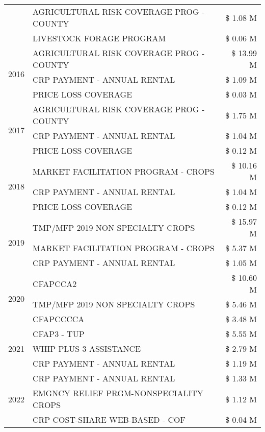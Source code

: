 \begin{tabular}{llr}
 & AGRICULTURAL RISK COVERAGE PROG - COUNTY & \$ 1.08 M \\
 & LIVESTOCK FORAGE PROGRAM & \$ 0.06 M \\
\cline{1-3}
\multirow[t]{3}{*}{2016} & AGRICULTURAL RISK COVERAGE PROG - COUNTY & \$ 13.99 M \\
 & CRP PAYMENT - ANNUAL RENTAL & \$ 1.09 M \\
 & PRICE LOSS COVERAGE & \$ 0.03 M \\
\cline{1-3}
\multirow[t]{3}{*}{2017} & AGRICULTURAL RISK COVERAGE PROG - COUNTY & \$ 1.75 M \\
 & CRP PAYMENT - ANNUAL RENTAL & \$ 1.04 M \\
 & PRICE LOSS COVERAGE & \$ 0.12 M \\
\cline{1-3}
\multirow[t]{3}{*}{2018} & MARKET FACILITATION PROGRAM - CROPS & \$ 10.16 M \\
 & CRP PAYMENT - ANNUAL RENTAL & \$ 1.04 M \\
 & PRICE LOSS COVERAGE & \$ 0.12 M \\
\cline{1-3}
\multirow[t]{3}{*}{2019} & TMP/MFP 2019 NON SPECIALTY CROPS & \$ 15.97 M \\
 & MARKET FACILITATION PROGRAM - CROPS & \$ 5.37 M \\
 & CRP PAYMENT - ANNUAL RENTAL & \$ 1.05 M \\
\cline{1-3}
\multirow[t]{3}{*}{2020} & CFAPCCA2 & \$ 10.60 M \\
 & TMP/MFP 2019 NON SPECIALTY CROPS & \$ 5.46 M \\
 & CFAPCCCCA & \$ 3.48 M \\
\cline{1-3}
\multirow[t]{3}{*}{2021} & CFAP3 - TUP & \$ 5.55 M \\
 & WHIP PLUS 3 ASSISTANCE & \$ 2.79 M \\
 & CRP PAYMENT - ANNUAL RENTAL & \$ 1.19 M \\
\cline{1-3}
\multirow[t]{3}{*}{2022} & CRP PAYMENT - ANNUAL RENTAL & \$ 1.33 M \\
 & EMGNCY RELIEF PRGM-NONSPECIALITY CROPS & \$ 1.12 M \\
 & CRP COST-SHARE WEB-BASED - COF & \$ 0.04 M \\
\cline{1-3}
\bottomrule
\end{tabular}
